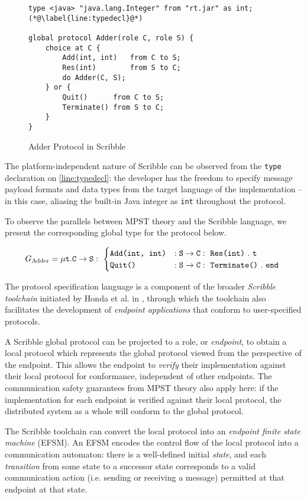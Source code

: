 \begin{figure}[!ht]
\begin{lstlisting}[language=Scribble]
type <java> "java.lang.Integer" from "rt.jar" as int; (*@\label{line:typedecl}@*)

global protocol Adder(role C, role S) {
	choice at C {
		Add(int, int)	from C to S;
		Res(int)		from S to C;
		do Adder(C, S);
	} or {
		Quit()		from C to S;
		Terminate()	from S to C;	
	}
}
\end{lstlisting}
\caption{Adder Protocol in Scribble}
\label{fig:adder}
\end{figure}

The platform-independent nature of Scribble 
can be observed from the \texttt{type} declaration 
on \cref{line:typedecl}: 
the developer has the freedom to specify message payload formats 
and data types from the target language of the implementation 
-- in this case, aliasing the built-in Java integer as 
\texttt{int} throughout the protocol.

To observe the parallels between MPST theory
and the Scribble language,
we present the corresponding global type for
the  protocol below.

\[
G_\text{Adder} = \mu\textnormal{\texttt{t}}.{
{\mathtt{C}} \to {\mathtt{S}}: ~ {
	\begin{cases}
		\texttt{Add(int, int)} & :
			{\mathtt{S}} \to {\mathtt{C}}: ~ {\texttt{Res(int)}} ~. ~\textnormal{\texttt{t}} \\
		\texttt{Quit()} & : 
			{\mathtt{S}} \to {\mathtt{C}}: ~ {\texttt{Terminate()}} ~.~ \textnormal{\texttt{end}} \\		
	\end{cases}
} ~} 
\]

The protocol specification language is 
a component of the broader 
\textit{Scribble toolchain} initiated by 
Honda et al. in \cite{Scribble}, 
through which the toolchain also facilitates 
the development of 
\textit{endpoint applications} that 
conform to user-specified protocols.

A Scribble global protocol can be projected
to a role, or \textit{endpoint},
to obtain a local protocol which represents
the global protocol viewed from the perspective
of the endpoint.
This allows the endpoint to \textit{verify} their
implementation against their local protocol
for conformance, independent of other endpoints.
The communication safety guarantees from MPST
theory also apply here: if the implementation
for each endpoint is verified against their
local protocol, the distributed system as
a whole will conform to the global protocol.

The Scribble toolchain can convert the local
protocol into an \textit{endpoint finite state machine}
(EFSM).
An EFSM encodes the control flow of the local
protocol into a communication automaton:
there is a well-defined initial \textit{state},
and each \textit{transition} from some state to a
successor state corresponds to a valid communication
action (i.e. sending or receiving a message) permitted
at that endpoint at that state.


